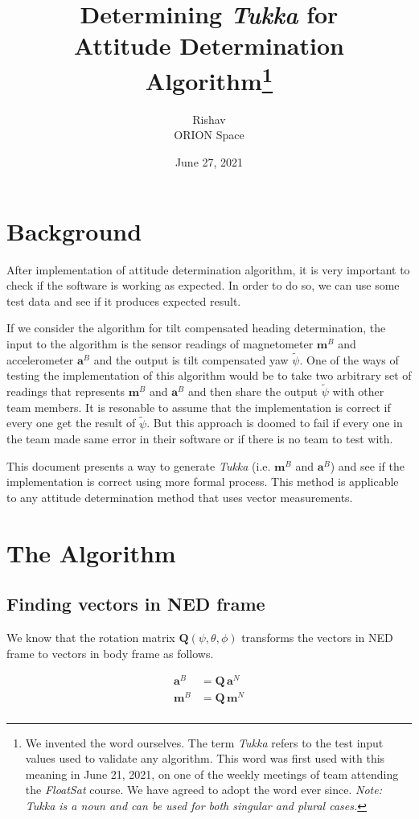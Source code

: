 \documentclass[12pt]{article}
\title{Determining \textit{Tukka} for \\ Attitude Determination Algorithm\footnote{We invented the word ourselves. The term \textit{Tukka} refers to the test input values used to validate any algorithm. This word was first used with this meaning in June 21, 2021, on one of the weekly meetings of team attending the \textit{FloatSat} course. We have agreed to adopt the word ever since. \textit{Note: Tukka is a noun and can be used for both singular and plural cases.}}}
\author{Rishav \\ ORION Space}
\date{June 27, 2021}
\begin{document}
\maketitle
\tableofcontents

\newpage
\section{Background}
After implementation of attitude determination algorithm, it is very important to check if the software is working as expected. In order to do so, we can use some test data and see if it produces expected result. \medskip

If we consider the algorithm for tilt compensated heading determination, the input to the algorithm is the sensor readings of magnetometer $\bm{m}^{B}$ and accelerometer $\bm{a}^{B}$ and the output is tilt compensated yaw $\tilde{\psi}$. One of the ways of testing the implementation of this algorithm would be to take two arbitrary set of readings that represents $\bm{m}^{B}$ and $\bm{a}^{B}$ and then share the output $\tilde{\psi}$ with other team members. It is resonable to assume that the implementation is correct if every one get the result of $\tilde{\psi}$. But this approach is doomed to fail if every one in the team made same error in their software or if there is no team to test with. \medskip

This document presents a way to generate \textit{Tukka} (i.e. $\bm{m}^{B}$ and $\bm{a}^{B}$) and see if the implementation is correct using more formal process. This method is applicable to any attitude determination method that uses vector measurements.

\section{The Algorithm}
\subsection{Finding vectors in NED frame}
We know that the rotation matrix $\bm{Q}(\psi,\theta,\phi)$ transforms the vectors in NED frame to vectors in body frame as follows.

\begin{equation}
    \begin{split}
        \bm{a}^{B} &= \bm{Q}\,\bm{a}^{N} \\
        \bm{m}^{B} &= \bm{Q}\,\bm{m}^{N} \\
        \label{eqn::main}
    \end{split}
\end{equation}
\end{document}
